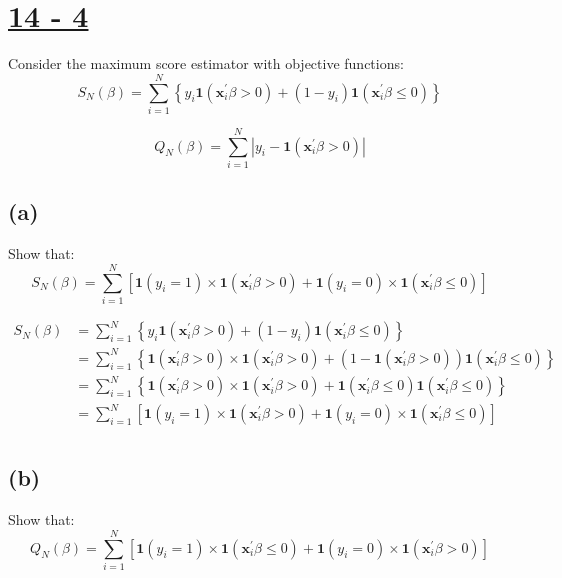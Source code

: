 \documentclass[11pt]{article}
\theoremstyle{definition}
\begin{document}
\section*{\underline{14 - 4}} 
Consider the maximum score estimator with objective functions:
\begin{equation*}
S_N(\beta)=\sum^N_{i=1}\left\{y_i\boldsymbol{1}(\boldsymbol{x}_i^{'}\beta>0)+(1-y_i)\boldsymbol{1}(\boldsymbol{x}_i^{'}\beta\leq0)\right\}
\end{equation*}

\begin{equation*}
Q_{N}(\beta)=\sum^{N}_{i=1}|y_i-\boldsymbol{1}(\boldsymbol{x}_i^{'}\beta>0)|
\end{equation*}
 
\subsection*{(a)}
Show that:
\begin{equation*}
S_N(\beta)=\sum^N_{i=1}\left[\boldsymbol{1}(y_i=1) \times \boldsymbol{1}(\boldsymbol{x}_i^{'}\beta>0)+\boldsymbol{1}(y_i=0) \times \boldsymbol{1}(\boldsymbol{x}_i^{'}\beta\leq0)\right]
\end{equation*}

\begin{equation*}
\begin{split}
S_N(\beta) &=\sum^N_{i=1}\left\{y_i\boldsymbol{1}(\boldsymbol{x}_i^{'}\beta>0)+(1-y_i)\boldsymbol{1}(\boldsymbol{x}_i^{'}\beta\leq0)\right\} \\
 &=\sum^N_{i=1}\left\{ \boldsymbol{1}(\boldsymbol{x}_i^{'}\beta>0) \times \boldsymbol{1}(\boldsymbol{x}_i^{'}\beta>0)+(1-\boldsymbol{1}(\boldsymbol{x}_i^{'}\beta>0))\boldsymbol{1}(\boldsymbol{x}_i^{'}\beta\leq0)\right\} \\
  &=\sum^N_{i=1}\left\{ \boldsymbol{1}(\boldsymbol{x}_i^{'}\beta>0) \times \boldsymbol{1}(\boldsymbol{x}_i^{'}\beta>0)+\boldsymbol{1}(\boldsymbol{x}_i^{'}\beta \leq0)\boldsymbol{1}(\boldsymbol{x}_i^{'}\beta\leq0)\right\} \\
 &= \sum^N_{i=1}\left[\boldsymbol{1}(y_i=1) \times \boldsymbol{1}(\boldsymbol{x}_i^{'}\beta>0)+\boldsymbol{1}(y_i=0) \times \boldsymbol{1}(\boldsymbol{x}_i^{'}\beta\leq0)\right] \\
\end{split}
\end{equation*}

\subsection*{(b)}
Show that:
\begin{equation*}
Q_N(\beta)=\sum^N_{i=1}\left[\boldsymbol{1}(y_i=1) \times \boldsymbol{1}(\boldsymbol{x}_i^{'}\beta\leq0)+\boldsymbol{1}(y_i=0) \times \boldsymbol{1}(\boldsymbol{x}_i^{'}\beta>0)\right]
\end{equation*}
\end{document}
